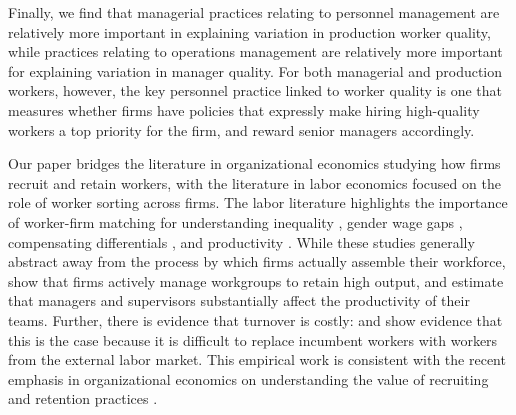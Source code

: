 


Finally, we find that managerial practices relating to personnel management are relatively more important in explaining variation in production worker quality, while practices relating to operations management are relatively more important for explaining variation in manager quality. For both managerial and production workers, however, the key personnel practice linked to worker quality is one that measures whether firms have policies that expressly make hiring high-quality workers a top priority for the firm, and reward senior managers accordingly. 

Our paper bridges the literature in organizational economics studying how firms recruit and retain workers, with the literature in labor economics focused on the role of worker sorting across firms. The labor literature highlights the importance of worker-firm matching for understanding inequality \citep{Card2013,Alvarez:Firms:AEJM:2018,Song:Firming:QJE:2018}, gender wage gaps \citep{Card:Bargaining:QJE:2016}, compensating differentials \citep{Lavetti:CDEM:WP:2018,Sorkin:Ranking:QJE:2018}, and productivity \citep{Iranzo2008}. While these studies generally abstract away from the process by which firms actually assemble their workforce, \citet{Hensvik2018} show that firms actively manage workgroups to retain high output, and \citet{shaw_bosses} estimate that managers and supervisors substantially affect the productivity of their teams. Further, there is evidence that turnover is costly: \citet{Jager2016} and \citet{Gallen2018} show evidence that this is the case because it is difficult to replace incumbent workers with workers from the external labor market. This empirical work is consistent with the recent emphasis in organizational economics on understanding the value of recruiting and retention practices \citep{OyerSchaefer:HLE:2011,Hoffman:Discretion:QJE:2018}. 

